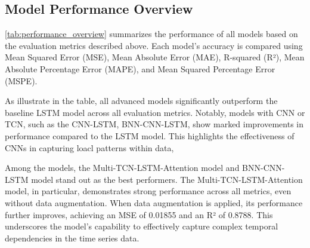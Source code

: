 \documentclass[final-report]{report-template}
\begin{document}
\subsection{Model Performance Overview}
\autoref{tab:performance_overview} summarizes the performance of all models based on the evaluation metrics described above. Each model's accuracy is compared using Mean Squared Error (MSE), Mean Absolute Error (MAE), R-squared (R²), Mean Absolute Percentage Error (MAPE), and Mean Squared Percentage Error (MSPE).
\begin{table}[h]
\centering
\caption{Performance Overview of Different Models 5days}
\label{tab:performance_overview}
\end{table}
As illustrate in the table, all advanced models significantly outperform the baseline LSTM model across all evaluation metrics. Notably, models with CNN or TCN, such as the CNN-LSTM, BNN-CNN-LSTM, show marked improvements in performance compared to the LSTM model. This highlights the effectiveness of CNNs in capturing loacl patterns within data, 

Among the models, the Multi-TCN-LSTM-Attention model and BNN-CNN-LSTM model stand out as the best performers. The Multi-TCN-LSTM-Attention model, in particular, demonstrates strong performance across all metrics, even without data augmentation. When data augmentation is applied, its performance further improves, achieving an MSE of 0.01855 and an R² of 0.8788. This underscores the model's capability to effectively capture complex temporal dependencies in the time series data. 
\end{document}
